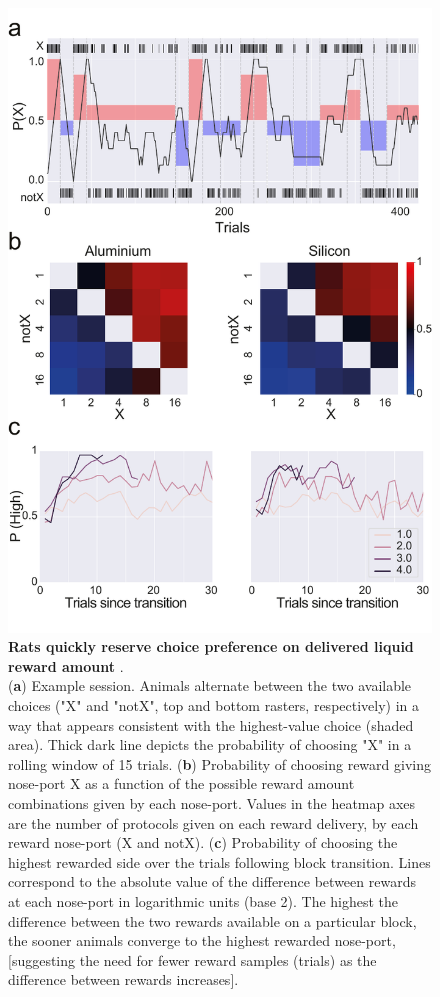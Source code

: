 \begin{figure}[ht] 
	\centering
	\includegraphics[width=1.0\linewidth]{Figures/Artboard 9.pdf}
	\caption{\textbf{Rats quickly reserve choice preference on delivered liquid reward amount }.\\
		(\textbf{a}) Example session. Animals alternate between the two available choices ("X" and "notX", top and bottom rasters, respectively) in a way that appears consistent with the highest-value choice (shaded area). Thick dark line depicts the probability of choosing "X" in a rolling window of 15 trials. (\textbf{b}) Probability of choosing reward giving nose-port X as a function of the possible reward amount combinations given by each nose-port. Values in the heatmap axes are the number of protocols given on each reward delivery, by each reward nose-port (X and notX). (\textbf{c}) Probability of choosing the highest rewarded side over the trials following block transition. Lines correspond to the absolute value of the difference between rewards at each nose-port in logarithmic units (base 2). The highest the difference between the two rewards available on a particular block, the sooner animals converge to the highest rewarded nose-port, [suggesting the need for fewer reward samples (trials) as the difference between rewards increases]. }
	\label{fig:Behavior} 
\end{figure}

